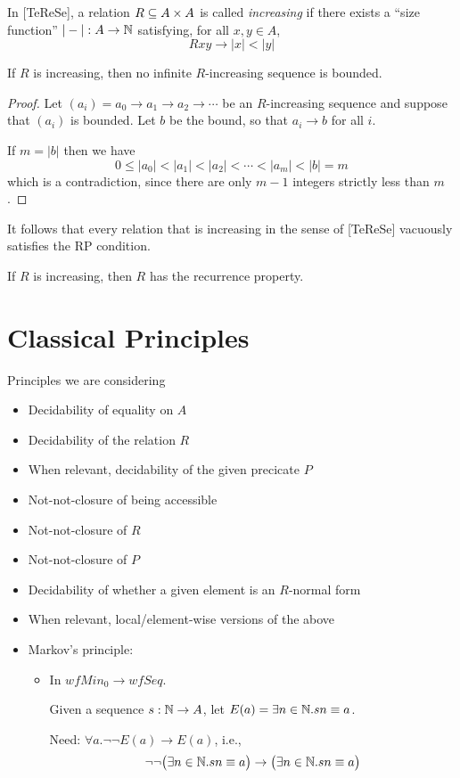 \documentclass{scrartcl}
\begin{document}
In [TeReSe], a relation $R \subseteq A \times A$ is called \emph{increasing} if there
exists a ``size function'' $|-| : A \to \mathbb{N}$ satisfying, for all $x, y \in A$,
 \[ Rxy \to |x| < |y| \]

\begin{prop}
  If $R$ is increasing, then no infinite $R$-increasing sequence is bounded.
\end{prop}
\begin{proof}
  Let $(a_i) = a_0 \to a_1 \to a_2 \to \cdots$ be an $R$-increasing sequence
  and suppose that $(a_i)$ is bounded.  Let $b$ be the bound, so that $a_i \to b$ for all $i$.

  If $m = |b|$ then we have
  \[ 0 \le |a_0| < |a_1| < |a_2| < \cdots < |a_m| < |b| = m \]
  which is a contradiction, since there are only $m-1$ integers strictly less than $m$.
\end{proof}

It follows that every relation that is increasing in the sense of [TeReSe]
vacuously satisfies the RP condition.

\begin{cor}
  If $R$ is increasing, then $R$ has the recurrence property.
\end{cor}


\section{Classical Principles}
Principles we are considering
\begin{itemize}
  \item Decidability of equality on $A$
  \item Decidability of the relation $R$
  \item When relevant, decidability of the given precicate $P$
  \item Not-not-closure of being accessible
  \item Not-not-closure of $R$
  \item Not-not-closure of $P$
  \item Decidability of whether a given element is an $R$-normal form
  \item When relevant, local/element-wise versions of the above
  \item Markov's principle:
  \begin{itemize}
    \item In $wfMin_0 \to wfSeq$.

    Given a sequence $s : \mathbb{N} \to A$, let $E(a) = \exists n \in \mathbb{N}. s n \equiv a$.

    Need: $\forall a. \lnot\lnot E(a) \to E(a)$, i.e.,
    \[\lnot\lnot \big(\exists n \in \mathbb{N}. s n \equiv a\big)
          \to \big(\exists n \in \mathbb{N}. s n \equiv a\big)\]

  \end{itemize}
\end{itemize}
\end{document}
